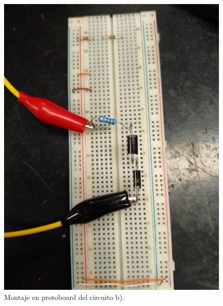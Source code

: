 \documentclass[chaptersright]{informeutn}
\begin{document}
\begin{figure}[H]
    \centering
    \begin{minipage}{0.45\textwidth}
    \centering
    \includegraphics[width=\textwidth]{pictures/circuito_B.jpeg}
    \caption{Montaje en protoboard del circuito b).}
\end{minipage}
\hspace{0.05\textwidth}
    \begin{minipage}{0.4\textwidth}
    \centering

\end{minipage}
\end{figure}
\end{document}

